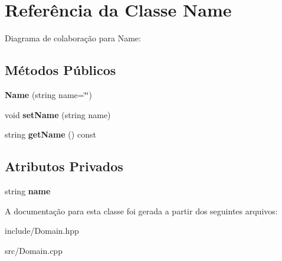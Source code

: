 \hypertarget{className}{}\section{Referência da Classe Name}
\label{className}


Diagrama de colaboração para Name\+:
\subsection*{Métodos Públicos}
\begin{DoxyCompactItemize}
\item 
{\bfseries Name} (string name=\char`\"{}\char`\"{})\hypertarget{className_a8491080117829fa312de01ec2ae51f21}{}\label{className_a8491080117829fa312de01ec2ae51f21}

\item 
void {\bfseries set\+Name} (string name)\hypertarget{className_a7207dd93f876f025871f5a1873ea093c}{}\label{className_a7207dd93f876f025871f5a1873ea093c}

\item 
string {\bfseries get\+Name} () const \hypertarget{className_a54879872f0b3d8363093ca81e8bfe228}{}\label{className_a54879872f0b3d8363093ca81e8bfe228}

\end{DoxyCompactItemize}
\subsection*{Atributos Privados}
\begin{DoxyCompactItemize}
\item 
string {\bfseries name}\hypertarget{className_ae8641ff4d989eb0f990aacd5dba0e42b}{}\label{className_ae8641ff4d989eb0f990aacd5dba0e42b}

\end{DoxyCompactItemize}


A documentação para esta classe foi gerada a partir dos seguintes arquivos\+:\begin{DoxyCompactItemize}
\item 
include/Domain.\+hpp\item 
src/Domain.\+cpp\end{DoxyCompactItemize}
